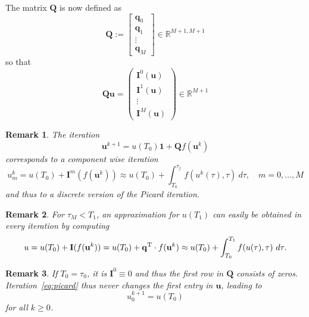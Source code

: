 \documentclass[11pt]{article}
\newcommand{\Tt}[1]{\mathbf{#1}}
\newtheorem{remark}{Remark}
\begin{document}
The matrix $\Tt{Q}$ is now defined as 
\begin{equation}
	\Tt{Q} := \begin{bmatrix} \Tt{q}_{0} \\ \Tt{q}_{1} \\ \vdots \\ \Tt{q}_{M} \end{bmatrix} \in \mathbb{R}^{M+1, M+1}
\end{equation}
so that 
\begin{equation}
	\Tt{Q} \Tt{u} = \begin{pmatrix} \Tt{I}^{0}(\Tt{u}) \\  \Tt{I}^{1}(\Tt{u}) \\ \vdots \\  \Tt{I}^{M}(\Tt{u}) \end{pmatrix} \in \mathbb{R}^{M+1}
\end{equation}
\begin{remark}\label{rem:picard}
The iteration
\begin{equation}
	\label{eq:picard}
	\Tt{u}^{k+1} = u(T_0) \Tt{1} + \Tt{Q} f(\Tt{u}^{k})
\end{equation}
corresponds to a component wise iteration
\begin{equation}
	\label{eq:picard_component}
	u^{k}_{m} = u(T_0) + \Tt{I}^{m}(f(\Tt{u}^{k}))  \approx u(T_0) + \int_{T_0}^{\tau_{j}} f(u^{k}(\tau), \tau) \ d\tau, \quad m=0,\ldots,M
\end{equation}
and thus to a discrete version of the Picard iteration. 
\end{remark}
\begin{remark}
For $\tau_{M} < T_{1}$, an approximation for $u(T_{1})$ can easily be obtained in every iteration by computing
\begin{equation}
	u = u(T_0) + \Tt{I}(f(\Tt{u}^{k})) = u(T_0) + \Tt{q}^{\rm T} \cdot f(\Tt{u}^{k}) \approx u(T_0) + \int_{T_0}^{T_1} f(u(\tau), \tau) \ d\tau.
\end{equation}
\end{remark}
\begin{remark}
If $T_0 = \tau_0$, it is $\Tt{I}^0 \equiv 0$ and thus the first row in $\Tt{Q}$ consists of zeros. Iteration~\eqref{eq:picard} thus never changes the first entry in $\Tt{u}$, leading to
\begin{equation}
	u^{k+1}_{0} = u(T_0)
\end{equation}
for all $k \geq 0$.
\end{remark}
\end{document}
